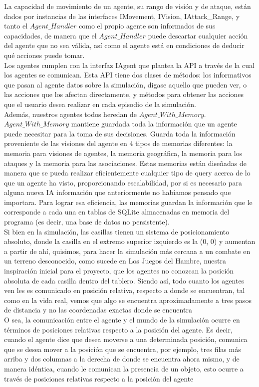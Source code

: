 \documentclass[11pt]{article}
\begin{document}
La capacidad de movimiento de un agente, su rango de visión y de ataque, están dados por instancias de las interfaces IMovement, IVision, IAttack\_Range, y tanto el $Agent\_Handler$ como el propio agente son informados de sus capacidades, de manera que el $Agent\_Handler$ puede descartar cualquier acción del agente que no sea válida, así como el agente está en condiciones de deducir qué acciones puede tomar.\\
Los agentes cumplen con la interfaz IAgent que plantea la API a través de la cual los agentes se comunican. Esta API tiene dos clases de métodos: los informativos que pasan al agente datos sobre la simulación, digase aquello que pueden ver, o las acciones que los afectan directamente, y métodos para obtener las acciones que el usuario desea realizar en cada episodio de la simulación.\\
Además, nuestros agentes todos heredan de $Agent\_With\_Memory$. $Agent\_With\_Memory$ mantiene guardada toda la información que un agente puede necesitar para la toma de sus decisiones. Guarda toda la información proveniente de las visiones del agente en 4 tipos de memorias diferentes: la memoria para visiones de agentes, la memoria geográfica, la memoria para los ataques y la memoria para las asociaciones. Estas memorias están diseñadas de manera que se pueda realizar eficientemente cualquier tipo de query acerca de lo que un agente ha visto, proporcionando escalabilidad, por si es necesario para alguna nueva IA información que anteriormente no habíamos pensado que importara. Para lograr esa eficiencia, las memorias guardan la información que le corresponde a cada una en tablas de SQLite almacenadas en memoria del programa (es decir, una base de datos no persistente).\\
Si bien en la simulación, las casillas tienen un sistema de posicionamiento absoluto, donde la casilla en el extremo superior izquierdo es la (0, 0) y aumentan a partir de ahí, quisimos, para hacer la simulación más cercana a un combate en un terreno desconocido, como sucede en Los Juegos del Hambre, nuestra inspiración inicial para el proyecto, que los agentes no conozcan la posición absoluta de cada casilla dentro del tablero. Siendo así, todo cuanto los agentes ven les es comunicado en posición relativa, respecto a donde se encuentran, tal como en la vida real, vemos que algo se encuentra aproximadamente a tres pasos de distancia y no las coordenadas exactas donde se encuentra\\
O sea, la comunicación entre el agente y el mundo de la simulación ocurre en términos de posiciones relativas respecto a la posición del agente. Es decir, cuando el agente dice que desea moverse a una determinada posición, comunica que se desea mover a la posición que se encuentra, por ejemplo, tres filas más arriba y dos columnas a la derecha de donde se encuentra ahora mismo, y de manera idéntica, cuando le comunican la presencia de un objeto, esto ocurre a través de posiciones relativas respecto a la posición del agente\\
\end{document}
